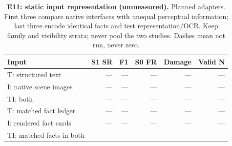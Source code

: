 \begin{table}[!ht]
\centering\small
\caption{\textbf{E11: static input representation (unmeasured).} Planned adapters. First three compare native interfaces with unequal perceptual information; last three encode identical facts and test representation/OCR. Keep family and visibility strata; never pool the two studies. Dashes mean not run, never zero.}
\begin{tabularx}{\textwidth}{@{}Xrrrrr@{}}\toprule
Input & S1 SR & F1 & S0 FR & Damage & Valid N\\\midrule
T: structured text & --- & --- & --- & --- & ---\\
I: native scene images & --- & --- & --- & --- & ---\\
TI: both & --- & --- & --- & --- & ---\\
T: matched fact ledger & --- & --- & --- & --- & ---\\
I: rendered fact cards & --- & --- & --- & --- & ---\\
TI: matched facts in both & --- & --- & --- & --- & ---\\
\bottomrule
\end{tabularx}
\end{table}
